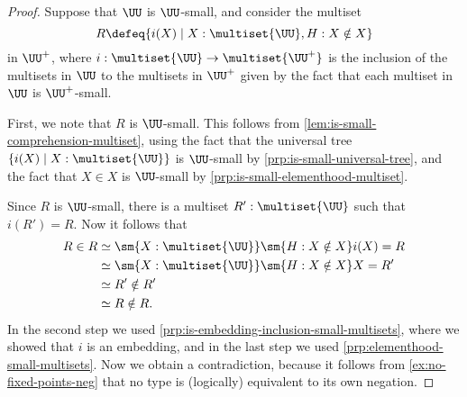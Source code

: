 \begin{proof}
  Suppose that $\UU$ is $\UU$-small, and consider the multiset
  \begin{equation*}
    R\defeq \{i(X) \mid X:\multiset{\UU}, H : X\notin X\}
  \end{equation*}
  in $\UU^+$, where $i:\multiset{\UU}\to\multiset{\UU^+}$ is the inclusion of the multisets in $\UU$ to the multisets in $\UU^+$ given by the fact that each multiset in $\UU$ is $\UU^+$-small.

  First, we note that $R$ is $\UU$-small. This follows from \cref{lem:is-small-comprehension-multiset}, using the fact that the universal tree $\{i(X)\mid X:\multiset{\UU}\}$ is $\UU$-small by \cref{prp:is-small-universal-tree}, and the fact that $X\in X$ is $\UU$-small by \cref{prp:is-small-elementhood-multiset}.

  Since $R$ is $\UU$-small, there is a multiset $R':\multiset{\UU}$ such that $i(R')=R$. Now it follows that
  \begin{align*}
    R\in R & \simeq \sm{X:\multiset{\UU}}\sm{H:X\notin X} i(X)=R \\
           & \simeq \sm{X:\multiset{\UU}}\sm{H:X\notin X} X=R' \\
           & \simeq R'\notin R' \\
           & \simeq R\notin R.
  \end{align*}
  In the second step we used \cref{prp:is-embedding-inclusion-small-multisets}, where we showed that $i$ is an embedding, and in the last step we used \cref{prp:elementhood-small-multisets}. Now we obtain a contradiction, because it follows from \cref{ex:no-fixed-points-neg} that no type is (logically) equivalent to its own negation.
\end{proof}

